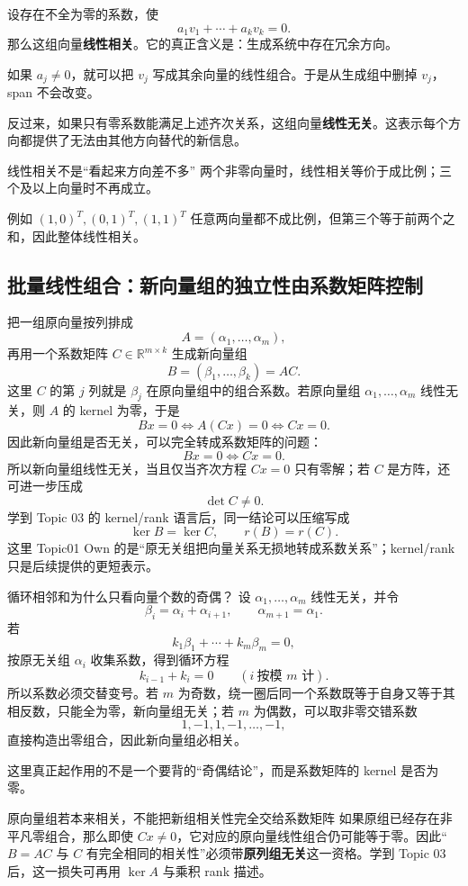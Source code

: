 \documentclass[11pt,a4paper]{ctexart}
\newcommand{\kw}[1]{\textbf{\color{deep}#1}}
\begin{document}
设存在不全为零的系数，使
\[
a_1v_1+\cdots+a_kv_k=0.
\]
那么这组向量\kw{线性相关}。它的真正含义是：生成系统中存在冗余方向。

如果 $a_j\neq0$，就可以把 $v_j$ 写成其余向量的线性组合。于是从生成组中删掉 $v_j$，span 不会改变。

反过来，如果只有零系数能满足上述齐次关系，这组向量\kw{线性无关}。这表示每个方向都提供了无法由其他方向替代的新信息。

\begin{warnbox}{线性相关不是“看起来方向差不多”}
两个非零向量时，线性相关等价于成比例；三个及以上向量时不再成立。

例如 $(1,0)^T,(0,1)^T,(1,1)^T$ 任意两向量都不成比例，但第三个等于前两个之和，因此整体线性相关。
\end{warnbox}

\subsection{批量线性组合：新向量组的独立性由系数矩阵控制}
把一组原向量按列排成
\[
A=(\alpha_1,\dots,\alpha_m),
\]
再用一个系数矩阵 $C\in\mathbb R^{m\times k}$ 生成新向量组
\[
B=(\beta_1,\dots,\beta_k)=AC.
\]
这里 $C$ 的第 $j$ 列就是 $\beta_j$ 在原向量组中的组合系数。若原向量组 $\alpha_1,\dots,\alpha_m$ 线性无关，则 $A$ 的 kernel 为零，于是
\[
Bx=0
\iff
A(Cx)=0
\iff
Cx=0.
\]
因此新向量组是否无关，可以完全转成系数矩阵的问题：
\[
Bx=0\iff Cx=0.
\]
所以新向量组线性无关，当且仅当齐次方程 $Cx=0$ 只有零解；若 $C$ 是方阵，还可进一步压成
\[
\boxed{\det C\ne0.}
\]
学到 Topic 03 的 kernel/rank 语言后，同一结论可以压缩写成
\[
\ker B=\ker C,\qquad r(B)=r(C).
\]
这里 Topic01 Own 的是“原无关组把向量关系无损地转成系数关系”；kernel/rank 只是后续提供的更短表示。

\begin{examplebox}{循环相邻和为什么只看向量个数的奇偶？}
设 $\alpha_1,\dots,\alpha_m$ 线性无关，并令
\[
\beta_i=\alpha_i+\alpha_{i+1},
\qquad
\alpha_{m+1}=\alpha_1.
\]
若
\[
k_1\beta_1+\cdots+k_m\beta_m=0,
\]
按原无关组 $\alpha_i$ 收集系数，得到循环方程
\[
k_{i-1}+k_i=0
\qquad(i\ \text{按模 }m\text{ 计}).
\]
所以系数必须交替变号。若 $m$ 为奇数，绕一圈后同一个系数既等于自身又等于其相反数，只能全为零，新向量组无关；若 $m$ 为偶数，可以取非零交错系数
\[
1,-1,1,-1,\dots,-1,
\]
直接构造出零组合，因此新向量组必相关。

这里真正起作用的不是一个要背的“奇偶结论”，而是系数矩阵的 kernel 是否为零。
\end{examplebox}

\begin{warnbox}{原向量组若本来相关，不能把新组相关性完全交给系数矩阵}
如果原组已经存在非平凡零组合，那么即使 $Cx\neq0$，它对应的原向量线性组合仍可能等于零。因此“$B=AC$ 与 $C$ 有完全相同的相关性”必须带\kw{原列组无关}这一资格。学到 Topic 03 后，这一损失可再用 $\ker A$ 与乘积 rank 描述。
\end{warnbox}
\end{document}
